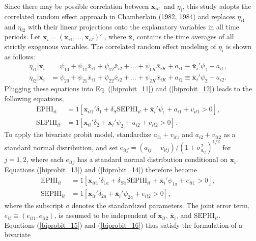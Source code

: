 \documentclass[legno,11pt]{article}
\begin{document}
Since there may be possible correlation between $\textbf{x}_{it1}$
and $\eta_{i}$, this study adopts the correlated random effect
approach in Chamberlain (1982, 1984) and replaces $\eta_{i1}$ and
$\eta_{i2}$ with their linear projections onto the explanatory
variables in all time periods. Let
$\textbf{x}_{i}=(\textbf{x}_{i1},...,\textbf{x}_{iT})'$ , where
$\bar{\textbf{x}}_{i}$ contains the time averages of all strictly
exogenous variables. The correlated random effect modeling of
$\eta_{i}$ is shown as follows:
\begin{align}
\eta_{i1}|\textbf{x}_{i}&=\psi_{10}+\psi_{11}\bar{x}_{i1}
+\psi_{12}\bar{x}_{i2}+ ...+\psi_{1K}\bar{x}_{iK}+a_{i1}\equiv\bar{\textbf{x}}_{i}'\psi_{1}+a_{i1},\\
\eta_{i2}|\textbf{x}_{i}&=\psi_{20}+\psi_{21}\bar{x}_{i1}
+\psi_{22}\bar{x}_{i2}+
...+\psi_{2K}\bar{x}_{iK}+a_{i2}\equiv\bar{\textbf{x}}_{i}'\psi_{2}+a_{i2}.
\end{align}
Plugging these equations into Eq. (\ref{biprobit_11}) and
(\ref{biprobit_12}) leads to the following equations,
\begin{align}
\text{EPHI}_{it}&= 1[\textbf{x}_{it1}'\delta_{1}+\delta_{S}\text{SEPHI}_{it}+\bar{\textbf{x}}_{i}'\psi_{1}+a_{i1}+ v_{it1}>0],\label{biprobit_13}\\ %
\text{SEPHI}_{it}&= 1[\textbf{x}_{it}'\delta_{2}+\bar{\textbf{x}}_{i}'\psi_{2}+a_{i2}+ v_{it2}>0].\label{biprobit_14} %
\end{align}
To apply the bivariate probit model, standardize $a_{i1}+ v_{it1}$
and $a_{i2}+ v_{it2}$ as a standard normal distribution, and set
$e_{itj}=(a_{ij}+ v_{itj})/(1+\sigma^{2}_{a_{ij}})^{1/2}$ for
$j=1,2$, where each $e_{itj}$ has a standard normal distribution
conditional on $\textbf{x}_{i}$. Equations (\ref{biprobit_13}) and
(\ref{biprobit_14}) therefore become
\begin{align}
\text{EPHI}_{it}&= 1[\textbf{x}_{it1}'\delta_{1a}+\delta_{Sa}\text{SEPHI}_{it}+\bar{\textbf{x}}_{i}'\psi_{1a}+e_{it1}>0],\label{biprobit_15}\\ %
\text{SEPHI}_{it}&= 1[\textbf{x}_{it}'\delta_{2a}+\bar{\textbf{x}}_{i}'\psi_{2a}+e_{it2}>0],\label{biprobit_16} %
\end{align}
where the subscript $a$ denotes the standardized parameters. The
joint error term, $e_{it}\equiv(e_{it1},e_{it2})$, is assumed to be
independent of $\textbf{x}_{it}$, $\bar{\textbf{x}}_{i}$, and
$\text{SEPHI}_{it}$. Equations (\ref{biprobit_15}) and
(\ref{biprobit_16}) thus satisfy the formulation of a bivariate
\end{document}
